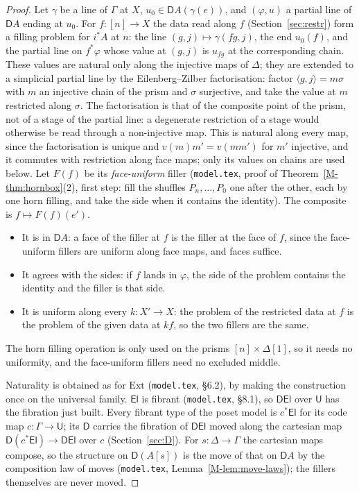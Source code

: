 \documentclass[11pt]{article}
\newcommand{\U}{\mathsf{U}}
\newcommand{\El}{\mathsf{El}}
\newcommand{\Ext}{\mathrm{Ext}}
\newcommand{\D}{\mathsf{D}}
\theoremstyle{plain}
\theoremstyle{definition}
\theoremstyle{remark}
\begin{document}
\begin{proof}
Let $\gamma$ be a line of $\Gamma$ at $X$, $u_0\in\D A(\gamma(e))$, and
$(\varphi,u)$ a partial line of $\D A$ ending at $u_0$. For $f:[n]\to X$ the
data read along $f$ (Section~\ref{sec:restr}) form a filling problem for
$i^*A$ at $n$: the line $(g,j)\mapsto\gamma(fg,j)$, the end $u_0(f)$, and the
partial line on $f^*\varphi$ whose value at $(g,j)$ is $u_{fg}$ at the
corresponding chain. These values are natural only along the injective maps
of $\Delta$; they are extended to a simplicial partial line by the
Eilenberg--Zilber factorisation: factor $\langle g,j\rangle=m\sigma$ with
$m$ an injective chain of the prism and $\sigma$ surjective, and take the
value at $m$ restricted along $\sigma$. The factorisation is that of the
composite point of the prism, not of a stage of the partial line: a degenerate
restriction of a stage would otherwise be read through a non-injective map. This is natural along every map,
since the factorisation is unique and $v(m)m'=v(mm')$ for $m'$ injective,
and it commutes with restriction along face maps; only its values on chains
are used below. Let $F(f)$ be its \emph{face-uniform} filler
(\texttt{model.tex}, proof of Theorem~\ref{M-thm:hornbox}(2), first step:
fill the shuffles $P_n,\dots,P_0$ one after the other, each by one horn
filling, and take the side when it contains the identity). The composite is
$f\mapsto F(f)(e')$.
\begin{itemize}
\item It is in $\D A$: a face of the filler at $f$ is the filler at the face
  of $f$, since the face-uniform fillers are uniform along face maps, and
  faces suffice.
\item It agrees with the sides: if $f$ lands in $\varphi$, the side of the
  problem contains the identity and the filler is that side.
\item It is uniform along every $k:X'\to X$: the problem of the restricted
  data at $f$ is the problem of the given data at $kf$, so the two fillers
  are the same.
\end{itemize}
The horn filling operation is only used on the prisms $[n]\times\Delta[1]$,
so it needs no uniformity, and the face-uniform fillers need no excluded
middle.

Naturality is obtained as for $\Ext$ (\texttt{model.tex}, §6.2), by making the
construction once on the universal family. $\El$ is fibrant
(\texttt{model.tex}, §8.1), so $\D\El$ over $\U$ has the fibration just
built. Every fibrant type of the poset model is $c^*\El$ for its code map
$c:\Gamma\to\U$; its $\D$ carries the fibration of $\D\El$ moved along the
cartesian map $\D(c^*\El)\to\D\El$ over $c$ (Section~\ref{sec:D}). For
$s:\Delta\to\Gamma$ the cartesian maps compose, so the structure on
$\D(A[s])$ is the move of that on $\D A$ by the composition law of moves
(\texttt{model.tex}, Lemma~\ref{M-lem:move-laws}); the fillers themselves
are never moved.
\end{proof}
\end{document}
